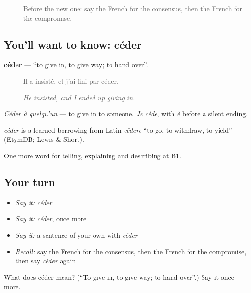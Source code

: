\begin{quote}
Before the new one: say the French for the consensus, then the French for the compromise.
\end{quote}

\subsection*{You'll want to know: céder}
\textbf{céder} — \textquotedblleft{}to give in, to give way; to hand over\textquotedblright{}.

\begin{quote}
Il a insisté, et j'ai fini par céder.
\end{quote}

\begin{quote}
\emph{He insisted, and I ended up giving in.}
\end{quote}

\emph{Céder à quelqu'un} — to give in to someone. \emph{Je cède}, with \emph{è} before a silent ending.

\begin{cousinweb}
\emph{céder} is a learned borrowing from Latin \emph{cēdere} \textquotedblleft{}to go, to withdraw, to yield\textquotedblright{} (EtymDB; Lewis \& Short).
\end{cousinweb}

\begin{grammarlens}[title={What you've built}]
One more word for telling, explaining and describing at B1.
\end{grammarlens}

\subsection*{Your turn}
\begin{itemize}
\raggedright
  \item \emph{Say it:} \emph{céder}
  \item \emph{Say it:} \emph{céder}, once more
  \item \emph{Say it:} a sentence of your own with \emph{céder}
  \item \emph{Recall:} say the French for the consensus, then the French for the compromise, then say \emph{céder} again
\end{itemize}

\begin{tcolorbox}[breakable,colback=teal!4,colframe=teal!35!black,title={Before you move on}]
What does céder mean? (\textquotedblleft{}To give in, to give way; to hand over\textquotedblright{}.) Say it once more.
\end{tcolorbox}
